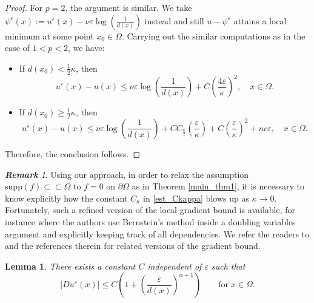 \documentclass[12pt,reqno]{amsart}
\numberwithin{figure}{section}
\theoremstyle{plain}
\newtheorem{lem}[thm]{Lemma}
\theoremstyle{remark}
\newtheorem{rem}{\bf{Remark}}
\numberwithin{equation}{section}
\begin{document}
\begin{proof}
For $p = 2$, the argument is similar. We take $\psi^\varepsilon(x):=u^\varepsilon(x)-\nu \varepsilon \log \left(\frac{1}{d(x)}\right)$ instead and still $u-\psi^\varepsilon$ attains a local minimum at some point $x_0 \in \Omega$. Carrying out the similar computations as in the case of $1 < p < 2$, we have:
\begin{itemize}
    \item If $\displaystyle d(x_0) < \frac{1}{2} \kappa$, then
    \begin{equation*}
        u^\varepsilon(x)-u(x) \leq \nu \varepsilon \log \left( \frac{1}{d(x)} \right) + C\left( \frac{4\varepsilon}{\kappa}\right)^2, \quad x \in \Omega.
    \end{equation*}
    \item If $\displaystyle d(x_0) \geq \frac{1}{2} \kappa$, then
    \begin{equation*}
        u^\varepsilon(x)-u(x) \leq \nu \varepsilon \log\left(\frac{1}{d(x)}\right) + 
        C C_\frac{\kappa}{2} \left( \frac{\varepsilon}{\kappa} \right) + C \left( \frac{\varepsilon}{\kappa} \right)^2 + nc\varepsilon, \quad x \in \Omega.
    \end{equation*}
\end{itemize}
Therefore, the conclusion follows.
\end{proof}

\begin{rem} Using our approach, in order to relax the assumption $\mathrm{supp}(f)\subset\subset\Omega$ to $f = 0$ on $\partial\Omega$ as in Theorem \ref{main_thm1}, it is necessary to know explicitly how the constant $C_\kappa$ in \eqref{est_Ckappa} blows up as $\kappa\to 0$. Fortunately, such a refined version of the local gradient bound is available, for instance \cite[Theorem 3.1]{Armstrong2015} where the authors use Bernstein's method inside a doubling variables argument and explicitly keeping track of all dependencies. We refer the readers to \cite{armstrong_stochastic_2012, barles_weak_1991,capuzzo_dolcetta_holder_2010} and the references therein for related versions of the gradient bound.
\end{rem}


\begin{lem} There exists a constant $C$ independent of $\varepsilon$ such that
\begin{equation*}
|Du^\varepsilon(x)| \leq C\left( 1 + \left(\frac{\varepsilon}{d(x)}\right)^{\alpha+1}\right) \qquad\text{for}\;x\in \Omega.
\end{equation*}
\end{lem}
\end{document}
